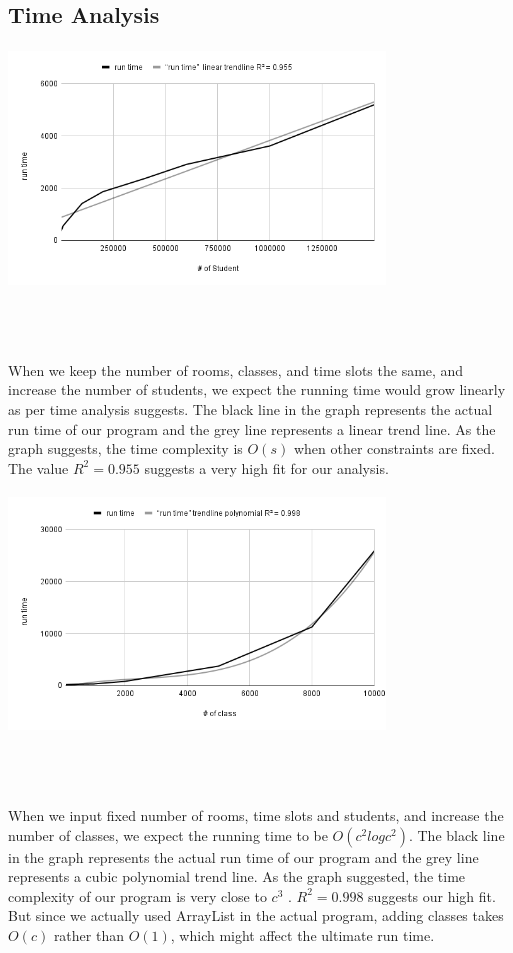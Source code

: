 \documentclass[11pt, oneside]{article}   	%
\begin{document}
\subsection{Time Analysis}

\centerline{\includegraphics[width=10cm, height=6.4cm]{chart.png}}\\\

When we keep the number of rooms, classes, and time slots the same, and increase the number of students, we expect the running time would grow linearly as per time analysis suggests. The black line in the graph represents the actual run time of our program and the grey line represents a linear trend line. As the graph suggests, the time complexity is $O(s)$ when other constraints are fixed. The value $R^2 = 0.955$ suggests a very high fit for our analysis.
\\

\centerline{\includegraphics[width=10cm, height=6.4cm]{chart (2).png}}\\\

When we input fixed number of rooms, time slots and students, and increase the number of classes, we expect the running time to be $O(c^2logc^2)$. The black line in the graph represents the actual run time of our program and the grey line represents a cubic polynomial trend line. As the graph suggested, the time complexity of our program is very close to $c^3$ . $R^2 = 0.998$ suggests our high fit. But since we actually used ArrayList in the actual program, adding classes takes $O(c)$ rather than $O(1)$, which might affect the ultimate run time.
\end{document}
